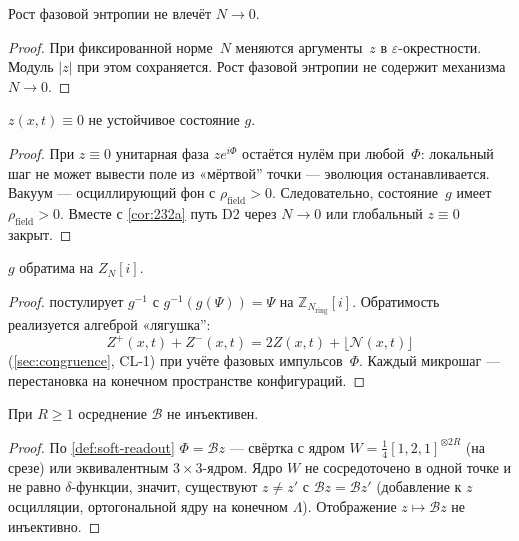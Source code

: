 \begin{lemma}
\label{lem:233}
Рост фазовой энтропии не влечёт $N\to 0$.
\end{lemma}

\begin{proof}
При фиксированной норме~$N$ меняются аргументы~$z$ в $\varepsilon$-окрестности.
Модуль $|z|$ при этом сохраняется.
Рост фазовой энтропии не содержит механизма $N\to 0$.
\end{proof}

\begin{lemma}
\label{lem:234}
$z(x,t)\equiv 0$ не устойчивое состояние $g$.
\end{lemma}

\begin{proof}
При $z\equiv 0$ унитарная фаза $z e^{i\Phi}$ остаётся нулём при любой~$\Phi$:
локальный шаг не может вывести поле из «мёртвой'' точки --- эволюция останавливается.
Вакуум --- осциллирующий фон с $\rho_{\mathrm{field}}>0$.
Следовательно, состояние~$g$ имеет $\rho_{\mathrm{field}}>0$.
Вместе с \cref{cor:232a} путь D2 через $N\to 0$ или глобальный $z\equiv 0$ закрыт.
\end{proof}

\begin{lemma}[Микрообратимость]
\label{lem:235}
$g$ обратима на $Z_N[i]$.
\end{lemma}

\begin{proof}
 постулирует $g^{-1}$ с $g^{-1}(g(\Psi))=\Psi$ на $\mathbb{Z}_{N_{\mathrm{ring}}}[i]$.
Обратимость реализуется алгеброй «лягушка'':
\[
  Z^+(x,t)+Z^-(x,t)=2Z(x,t)+\lfloor\mathcal{N}(x,t)\rfloor
\]
(\cref{sec:congruence}, CL-1) при учёте фазовых импульсов~$\Phi$.
Каждый микрошаг --- перестановка на конечном пространстве конфигураций.
\end{proof}

\begin{lemma}
\label{lem:236}
При $R\ge 1$ осреднение $\mathcal{B}$ не инъективен.
\end{lemma}

\begin{proof}
По \cref{def:soft-readout} $\Phi=\mathcal{B}z$ --- свёртка с ядром
$W=\tfrac14[1,2,1]^{\otimes 2R}$ (на срезе) или эквивалентным $3\times 3$-ядром.
Ядро $W$ не сосредоточено в одной точке и не равно $\delta$-функции,
значит, существуют $z\ne z'$ с $\mathcal{B}z=\mathcal{B}z'$
(добавление к $z$ осцилляции, ортогональной ядру на конечном $\Lambda$).
Отображение $z\mapsto\mathcal{B}z$ не инъективно.
\end{proof}

